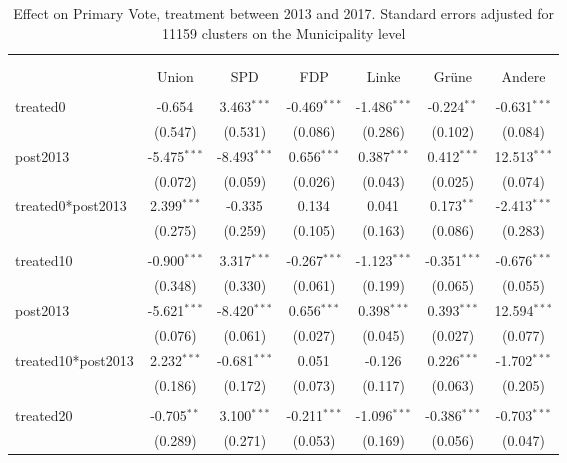 \documentclass[12pt]{article}
\begin{document}
 
\begin{table}[!htbp] \centering
  \caption{Effect on Primary Vote, treatment between 2013 and 2017. Standard errors adjusted for 11159 clusters on the Municipality level}
\begin{tabular}{@{\extracolsep{5pt}}lcccccc}
\\[-1.8ex]\hline
\hline \\[-1.8ex]
\\[-1.8ex] & \multicolumn{1}{c}{Union} & \multicolumn{1}{c}{SPD} & \multicolumn{1}{c}{FDP} & \multicolumn{1}{c}{Linke} & \multicolumn{1}{c}{Grüne} & \multicolumn{1}{c}{Andere}  \\
\hline \\[-1.8ex]
 treated0 & -0.654$^{}$ & 3.463$^{***}$ & -0.469$^{***}$ & -1.486$^{***}$ & -0.224$^{**}$ & -0.631$^{***}$ \\
  & (0.547) & (0.531) & (0.086) & (0.286) & (0.102) & (0.084) \\
 post2013 & -5.475$^{***}$ & -8.493$^{***}$ & 0.656$^{***}$ & 0.387$^{***}$ & 0.412$^{***}$ & 12.513$^{***}$ \\
  & (0.072) & (0.059) & (0.026) & (0.043) & (0.025) & (0.074) \\
 treated0*post2013 & 2.399$^{***}$ & -0.335$^{}$ & 0.134$^{}$ & 0.041$^{}$ & 0.173$^{**}$ & -2.413$^{***}$ \\
  & (0.275) & (0.259) & (0.105) & (0.163) & (0.086) & (0.283) \\
\hline \\[-1.8ex]
 treated10 & -0.900$^{***}$ & 3.317$^{***}$ & -0.267$^{***}$ & -1.123$^{***}$ & -0.351$^{***}$ & -0.676$^{***}$ \\
  & (0.348) & (0.330) & (0.061) & (0.199) & (0.065) & (0.055) \\
 post2013 & -5.621$^{***}$ & -8.420$^{***}$ & 0.656$^{***}$ & 0.398$^{***}$ & 0.393$^{***}$ & 12.594$^{***}$ \\
  & (0.076) & (0.061) & (0.027) & (0.045) & (0.027) & (0.077) \\
 treated10*post2013 & 2.232$^{***}$ & -0.681$^{***}$ & 0.051$^{}$ & -0.126$^{}$ & 0.226$^{***}$ & -1.702$^{***}$ \\
  & (0.186) & (0.172) & (0.073) & (0.117) & (0.063) & (0.205) \\
\hline \\[-1.8ex]
 treated20 & -0.705$^{**}$ & 3.100$^{***}$ & -0.211$^{***}$ & -1.096$^{***}$ & -0.386$^{***}$ & -0.703$^{***}$ \\
  & (0.289) & (0.271) & (0.053) & (0.169) & (0.056) & (0.047) \\

\end{tabular}
\end{table}
\end{document}
